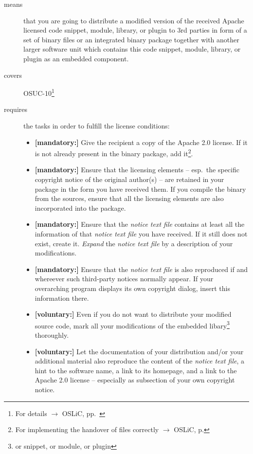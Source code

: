 \begin{description}
\item[means] that you are going to distribute a modified version of the received
Apache licensed code snippet, module, library, or plugin to 3rd parties in form
of a set of binary files or an integrated binary package together with another
larger software unit which contains this code snippet, module, library, or
plugin as an embedded component.
\item[covers] OSUC-10\footnote{For details $\rightarrow$ OSLiC, pp.\ \pageref{OSUC-10-DEF}}
\item[requires] the tasks in order to fulfill the license conditions:
\begin{itemize}
  
  \item \textbf{[mandatory:]} Give the recipient a copy of the Apache 2.0
  license. If it is not already present in the binary package, add
  it\footnote{For implementing the handover of files correctly $\rightarrow$
  OSLiC, p. \pageref{DistributingFilesHint}}.
  
  \item \textbf{[mandatory:]} Ensure that the licensing elements -- esp.\ the
  specific copyright notice of the original author(s) -- are retained in your
  package in the form you have received them. If you compile the binary from the
  sources, ensure that all the licensing elements are also incorporated into the
  package.
  
  \item \textbf{[mandatory:]} Ensure that the \emph{notice text file} contains
  at least all the information of that \emph{notice text file} you have
  received.  If it still does not exist, create it. \emph{Expand} the
  \emph{notice text file} by a description of your modifications.
 
  \item \textbf{[mandatory:]} Ensure that the \emph{notice text file} is also
  reproduced if and whereever such third-party notices normally appear. If your
  overarching program displays its own copyright dialog, insert this information
  there.
     
  \item \textbf{[voluntary:]} Even if you do not want to distribute your
  modified source code, mark all your modifications of the embedded
  libary\footnote{or snippet, or module, or plugin} thoroughly.
 
  \item \textbf{[voluntary:]} Let the documentation of your distribution and/or
  your additional material also reproduce the content of the \emph{notice text
  file}, a hint to the software name, a link to its homepage, and a link to the
  Apache 2.0 license -- especially as subsection of your own copyright notice.
  

\end{itemize}
\end{description}
